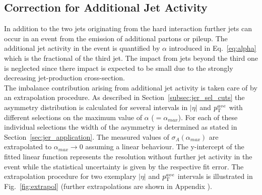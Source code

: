 \subsection{Correction for Additional Jet Activity}
\label{subsec:jer_corrections_alpha}
In addition to the two jets originating from the hard interaction further jets can occur in an event from the emission of additional partons or pileup. The additional jet activity in the event is quantified by $\alpha$ introduced in Eq.~\ref{eq:alpha} which is the fractional \pt of the third jet. The impact from jets beyond the third one is neglected since there impact is expected to be small due to the strongly decreasing jet-production cross-section. \\
The imbalance contribution arising from additional jet activity is taken care of by an extrapolation procedure. As described in Section~\ref{subsec:jer_sel_cuts} the asymmetry distribution is calculated for several intervals in $|\eta|$ and $p_{\text{T}}^{ave}$ with different selections on the maximum value of $\alpha$ ($=\alpha_{max}$). For each of these individual selections the width of the asymmetry is determined as stated in Section~\ref{sec:jer_application}. The measured values of $\sigma_{A}(\alpha_{max})$ are extrapolated to $\alpha_{max} \rightarrow 0$ assuming a linear behaviour. The y-intercept of the fitted linear function represents the resolution without further jet activity in the event while the statistical uncertainty is given by the respective fit error. The extrapolation procedure for two exemplary $|\eta|$ and $p_{\text{T}}^{ave}$ intervals is illustrated in Fig.~\ref{fig:extrapol} (further extrapolations are shown in Appendix ). \\
